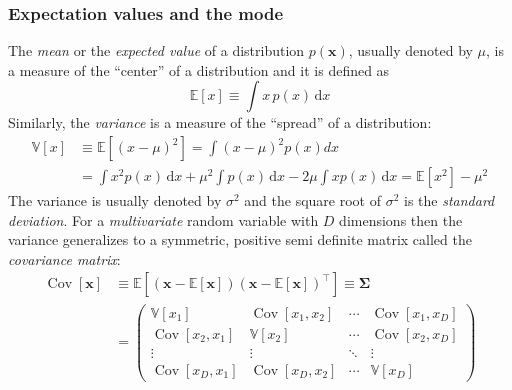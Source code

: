 \documentclass[12pt]{report}
\newcommand{\ud}{\,\mathrm{d}}
\renewcommand{\vec}[1]{\boldsymbol{\mathbf{#1}}}
\begin{document}
\subsubsection{Expectation values and the mode}
The \emph{mean} or the \emph{expected value} of a distribution $p(\vec{x})$,
usually denoted by $\mu$, is a measure of the ``center'' of a distribution and
it is defined as
\begin{equation}
    \mathbb{E}[x] \equiv\int x \,p(x) \ud x
\end{equation}
Similarly, the \emph{variance} is a measure of the ``spread'' of a distribution:
\begin{align}
    \mathbb{V}[x] & \equiv\mathbb{E}\left[(x-\mu)^{2}\right]=\int(x-\mu)^{2} p(x) d x                                           \\
                  & =\int x^{2} p(x) \ud x+\mu^{2} \int p(x) \ud x-2 \mu \int x p(x) \ud x=\mathbb{E}\left[x^{2}\right]-\mu^{2}
\end{align}
The variance is usually denoted by $\sigma^2$ and the square root of $\sigma^2$ is the
\emph{standard deviation}.
For a \emph{multivariate} random variable with $D$ dimensions then the variance generalizes to
a symmetric, positive semi definite matrix called the \emph{covariance matrix}:
\begin{align}
    \operatorname{Cov}[\vec{x}] & \equiv\mathbb{E}\left[(\vec{x}-\mathbb{E}[\vec{x}])(\vec{x}-\mathbb{E}[\vec{x}])^{\top}\right] \equiv \boldsymbol{\Sigma}                                                                                                                                                                                \\
                                & =\left(\begin{array}{cccc}
                                             \mathbb{V}\left[x_{1}\right]                & \operatorname{Cov}\left[x_{1}, x_{2}\right] & \cdots & \operatorname{Cov}\left[x_{1}, x_{D}\right] \\
                                             \operatorname{Cov}\left[x_{2}, x_{1}\right] & \mathbb{V}\left[x_{2}\right]                & \cdots & \operatorname{Cov}\left[x_{2}, x_{D}\right] \\
                                             \vdots                                      & \vdots                                      & \ddots & \vdots                                      \\
                                             \operatorname{Cov}\left[x_{D}, x_{1}\right] & \operatorname{Cov}\left[x_{D}, x_{2}\right] & \cdots & \mathbb{V}\left[x_{D}\right]
                                         \end{array}\right)
\end{align}
\end{document}
